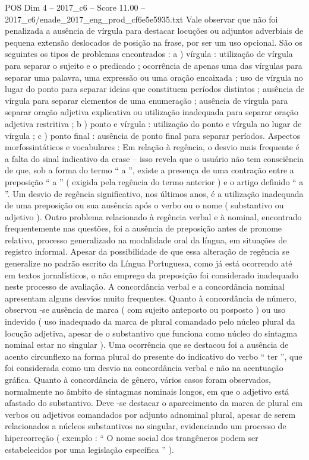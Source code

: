 \begin{textsample}{POS Dim 4 – 2017\_c6 – Score 11.00 – 2017\_c6/enade\_2017\_eng\_prod\_cf6e5e5935.txt}
Vale observar que não foi penalizada a ausência de vírgula para destacar locuções ou adjuntos adverbiais de pequena extensão deslocados de posição na frase, por ser um uso opcional.
São os seguintes os tipos de problemas encontrados : a ) vírgula : utilização de vírgula para separar o sujeito e o predicado ; ocorrência de apenas uma das vírgulas para separar uma palavra, uma expressão ou uma oração encaixada ; uso de vírgula no lugar do ponto para separar ideias que constituem períodos distintos ; ausência de vírgula para separar elementos de uma enumeração ; ausência de vírgula para separar oração adjetiva explicativa ou utilização inadequada para separar oração adjetiva restritiva ; b ) ponto e vírgula : utilização do ponto e vírgula no lugar de vírgula ; c ) ponto final : ausência de ponto final para separar períodos.
Aspectos morfossintáticos e vocabulares : Em relação à regência, o desvio mais frequente é a falta do sinal indicativo da crase – isso revela que o usuário não tem consciência de que, sob a forma do termo “ a ”, existe a presença de uma contração entre a preposição “ a ” ( exigida pela regência do termo anterior ) e o artigo definido “ a ”.
Um desvio de regência significativo, nos últimos anos, é a utilização inadequada de uma preposição ou sua ausência após o verbo ou o nome ( substantivo ou adjetivo ).
Outro problema relacionado à regência verbal e à nominal, encontrado frequentemente nas questões, foi a ausência de preposição antes de pronome relativo, processo generalizado na modalidade oral da língua, em situações de registro informal.
Apesar da possibilidade de que essa alteração de regência se generalize no padrão escrito da Língua Portuguesa, como já está ocorrendo até em textos jornalísticos, o não emprego da preposição foi considerado inadequado neste processo de avaliação.
A concordância verbal e a concordância nominal apresentam alguns desvios muito frequentes.
Quanto à concordância de número, observou -se ausência de marca ( com sujeito anteposto ou posposto ) ou uso indevido ( uso inadequado da marca de plural comandado pelo núcleo plural da locução adjetiva, apesar de o substantivo que funciona como núcleo do sintagma nominal estar no singular ).
Uma ocorrência que se destacou foi a ausência de acento circunflexo na forma plural do presente do indicativo do verbo “ ter ”, que foi considerada como um desvio na concordância verbal e não na acentuação gráfica.
Quanto à concordância de gênero, vários casos foram observados, normalmente no âmbito de sintagmas nominais longos, em que o adjetivo está afastado do substantivo.
Deve -se destacar o aparecimento da marca de plural em verbos ou adjetivos comandados por adjunto adnominal plural, apesar de serem relacionados a núcleos substantivos no singular, evidenciando um processo de hipercorreção ( exemplo : “ O nome social dos trangêneros podem ser estabelecidos por uma legislação específica ” ).

\end{textsample}
